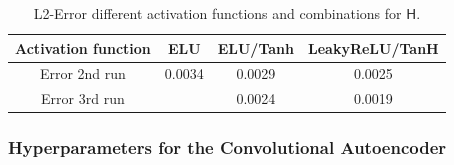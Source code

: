 \documentclass[12pt, a4paper]{article}
\newcommand{\hy}{\(\textsf{H}\)}
\begin{document}
\begin{table}[!htbp]\centering
	\begin{tabular}{ |c|c|c|c| }
		\hline
		Activation function & ELU & ELU/Tanh & LeakyReLU/TanH \\ 
		\hline
		Error 2nd run& 0.0034 & 0.0029 & 0.0025\\ \hline
		Error 3rd run& 		  & 0.0024 & 0.0019 \\ \hline
	\end{tabular}
	\caption{L2-Error different activation functions and combinations for \hy.}
	\label{Tab:Activations Rare 2nd}
\end{table}
\subsubsection{Hyperparameters for the Convolutional Autoencoder}\label{Convolutional}
\end{document}
